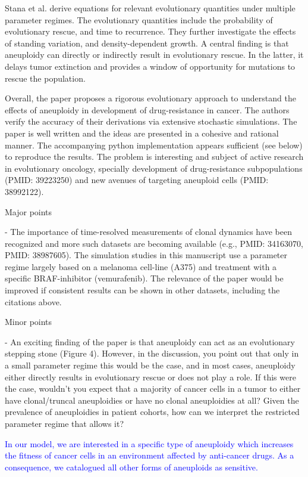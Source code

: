 \documentclass[12pt]{extarticle}
\begin{document}
Stana et al. derive equations for relevant evolutionary quantities under multiple parameter regimes. The evolutionary quantities include the probability of evolutionary rescue, and time to recurrence. They further investigate the effects of standing variation, and density-dependent growth. A central finding is that aneuploidy can directly or indirectly result in evolutionary rescue. In the latter, it delays tumor extinction and provides a window of opportunity for mutations to rescue the population.

Overall, the paper proposes a rigorous evolutionary approach to understand the effects of aneuploidy in development of drug-resistance in cancer. The authors verify the accuracy of their derivations via extensive stochastic simulations. The paper is well written and the ideas are presented in a cohesive and rational manner. The accompanying python implementation appears sufficient (see below) to reproduce the results. The problem is interesting and subject of active research in evolutionary oncology, specially development of drug-resistance subpopulations (PMID: 39223250) and new avenues of targeting aneuploid cells (PMID: 38992122).

Major points

- The importance of time-resolved measurements of clonal dynamics have been recognized and more such datasets are becoming available (e.g., PMID: 34163070, PMID: 38987605). The simulation studies in this manuscript use a parameter regime largely based on a melanoma cell-line (A375) and treatment with a specific BRAF-inhibitor (vemurafenib). The relevance of the paper would be improved if consistent results can be shown in other datasets, including the citations above.

Minor points

- An exciting finding of the paper is that aneuploidy can act as an evolutionary stepping stone (Figure 4). However, in the discussion, you point out that only in a small parameter regime this would be the case, and in most cases, aneuploidy either directly results in evolutionary rescue or does not play a role. If this were the case, wouldn't you expect that a majority of cancer cells in a tumor to either have clonal/truncal aneuploidies or have no clonal aneuploidies at all? Given the prevalence of aneuploidies in patient cohorts, how can we interpret the restricted parameter regime that allows it?

\textcolor{blue}{In our model, we are interested in a specific type of aneuploidy which increases the fitness of cancer cells in an environment affected by anti-cancer drugs. As a consequence, we catalogued all other forms of aneuploids as sensitive.} 
\end{document}
